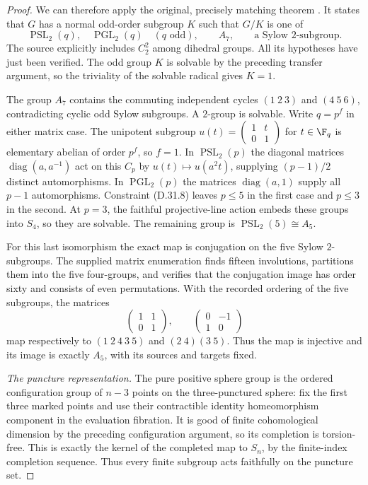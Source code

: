 \begin{proof}
We can therefore apply the original, precisely matching theorem
\cite[Theorem~I, p.~553]{A-GorensteinWalter1962}. It states that
$G$ has a normal odd-order subgroup $K$ such that $G/K$ is one
of
\[
       \operatorname{PSL}_2(q),\quad
       \operatorname{PGL}_2(q)\quad(q\text{ odd}),
       \qquad A_7,\qquad\text{a Sylow }2\text{-subgroup}.
                                                               \tag{D.31.9}
\]
The source explicitly includes $C_2^2$ among dihedral groups.
All its hypotheses have just been verified. The odd group $K$
is solvable by the preceding transfer argument, so the triviality
of the solvable radical gives $K=1$.

The group $A_7$ contains the commuting independent cycles
$(1\ 2\ 3)$ and $(4\ 5\ 6)$, contradicting cyclic odd Sylow
subgroups. A $2$-group is solvable. Write $q=p^f$ in either
matrix case. The unipotent subgroup
$u(t)=\left(\begin{smallmatrix}1&t\\0&1\end{smallmatrix}\right)$
for $t\in\F_q$ is elementary abelian of order $p^f$, so $f=1$.
In $\operatorname{PSL}_2(p)$ the diagonal matrices
$\operatorname{diag}(a,a^{-1})$ act on this $C_p$ by
$u(t)\mapsto u(a^2t)$, supplying $(p-1)/2$ distinct automorphisms.
In $\operatorname{PGL}_2(p)$ the matrices
$\operatorname{diag}(a,1)$ supply all $p-1$ automorphisms.
Constraint (D.31.8) leaves $p\leq5$ in the first case and
$p\leq3$ in the second. At $p=3$, the faithful projective-line
action embeds these groups into $S_4$, so they are solvable.
The remaining group is $\operatorname{PSL}_2(5)\cong A_5$.

For this last isomorphism the exact map is conjugation on the
five Sylow $2$-subgroups. The supplied matrix enumeration finds
fifteen involutions, partitions them into the five four-groups,
and verifies that the conjugation image has order sixty and
consists of even permutations. With the recorded ordering of
the five subgroups, the matrices
\[
 \begin{pmatrix}1&1\\0&1\end{pmatrix},\qquad
 \begin{pmatrix}0&-1\\1&0\end{pmatrix}
\]
map respectively to $(1\ 2\ 4\ 3\ 5)$ and
$(2\ 4)(3\ 5)$. Thus the map is injective and its image is exactly
$A_5$, with its sources and targets fixed.

\emph{The puncture representation.}
The pure positive sphere group is the ordered configuration
group of $n-3$ points on the three-punctured sphere: fix the
first three marked points and use their contractible identity
homeomorphism component in the evaluation fibration. It is good
of finite cohomological dimension by the preceding configuration
argument, so its completion is torsion-free. This is exactly
the kernel of the completed map to $S_n$, by the finite-index
completion sequence. Thus every finite subgroup acts faithfully
on the puncture set.


\end{proof}
